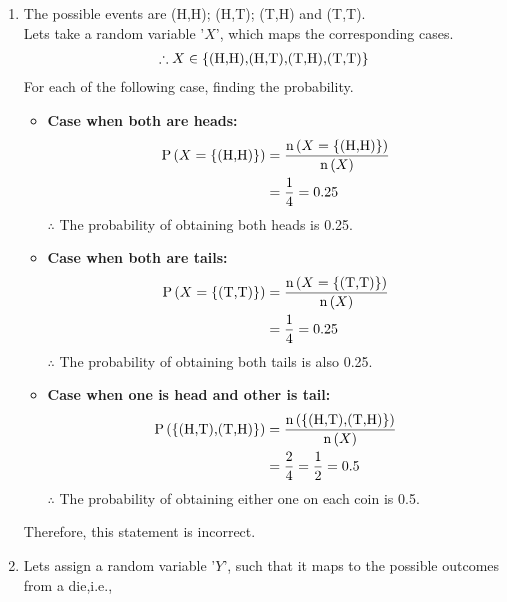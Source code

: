 \documentclass[journal,12pt,twocolumn]{IEEEtran}
\begin{document}
    \begin{enumerate}[label=(\roman*)]
    \item The possible events are (H,H); (H,T); (T,H) and (T,T).\\
    Lets take a random variable '$X$', which maps the corresponding cases.
    \begin{align*}
    \therefore X \in \left\{\text{(H,H),(H,T),(T,H),(T,T)}\right\}
    \end{align*}
    For each of the following case, finding the probability.
    \begin{itemize}
    \item \textbf{Case when both are heads:}
    \begin{align}
    \text{P}\left(X = \left\{\text{(H,H)}\right\}\right) &= \frac{\text{n}\left(X = \left\{\text{(H,H)}\right\}\right)}{\text{n}\left(X\right)}\\
                                              &= \frac{1}{4} = 0.25
    \end{align}
    $\therefore$ The probability of obtaining both heads is 0.25.
    \end{itemize}
    \begin{itemize}
    \item \textbf{Case when both are tails:}
    \begin{align}
    \text{P}\left(X = \left\{\text{(T,T)}\right\}\right) &= \frac{\text{n}\left(X = \left\{\text{(T,T)}\right\}\right)}{\text{n}\left(X\right)}\\
                                              &= \frac{1}{4} = 0.25
    \end{align}
    $\therefore$ The probability of obtaining both tails is also 0.25.
    \end{itemize}
    \begin{itemize}
    \item \textbf{Case when one is head and other is tail:}
    \begin{align}
    \text{P}\left(\left\{\text{(H,T),(T,H)}\right\}\right) &= \frac{\text{n}\left(\left\{\text{(H,T),(T,H)}\right\}\right)}{\text{n}\left(X\right)}\\
                                              &= \frac{2}{4} = \frac{1}{2} = 0.5
    \end{align}
    $\therefore$ The probability of obtaining either one on each coin is 0.5.
    \end{itemize}
    Therefore, this statement is incorrect.
    \item Lets assign a random variable '$Y$', such that it maps to the possible outcomes from a die,i.e.,
    \begin{align*}

\end{align*}
\end{enumerate}
\end{document}
